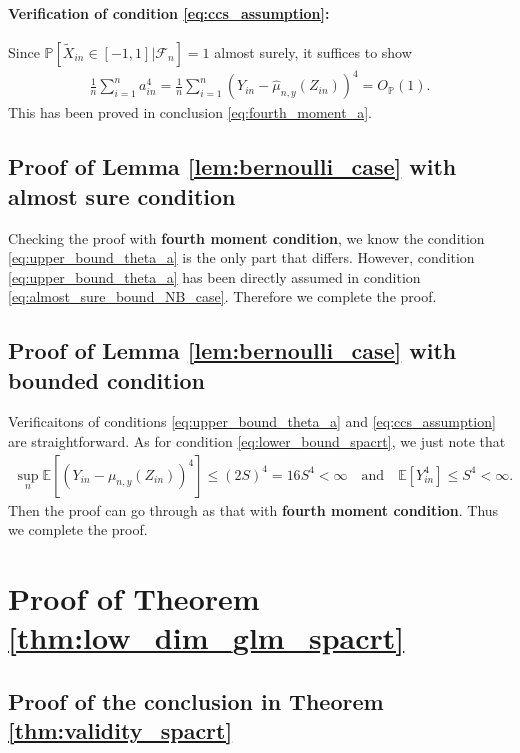 \documentclass[12pt]{article}
\theoremstyle{definition}
\def\P{\mathbb{P}}
\def\P{\mathbb{P}}
\newcommand{\E}{\mathbb E}								%
\renewcommand{\P}{\mathbb{P}}							%
\newcommand{\srz}{Z}									%
\newcommand{\srxk}{\widetilde X}						%
\newcommand{\sry}{Y}									%
\begin{document}
  \paragraph{Verification of condition \eqref{eq:ccs_assumption}:}

  Since $\P[\srxk_{in}\in [-1,1]|\mathcal{F}_n]=1$ almost surely, it suffices to show 
  \begin{align*}
    \frac{1}{n}\sum_{i=1}^n a_{in}^4=\frac{1}{n}\sum_{i=1}^n (\sry_{in}-\widehat{\mu}_{n,y}(\srz_{in}))^4=O_{\P}(1).
  \end{align*}
  This has been proved in conclusion \eqref{eq:fourth_moment_a}.

\subsection{Proof of Lemma \ref{lem:bernoulli_case} with almost sure condition}

Checking the proof with \textbf{fourth moment condition}, we know the condition \eqref{eq:upper_bound_theta_a} is the only part that differs. However, condition \eqref{eq:upper_bound_theta_a} has been directly assumed in condition \eqref{eq:almost_sure_bound_NB_case}. Therefore we complete the proof.

\subsection{Proof of Lemma \ref{lem:bernoulli_case} with bounded condition}

Verificaitons of conditions \eqref{eq:upper_bound_theta_a} and \eqref{eq:ccs_assumption} are straightforward. As for condition \eqref{eq:lower_bound_spacrt}, we just note that 
\begin{align*}
  \sup_n\E[(\sry_{in}-\mu_{n,y}(\srz_{in}))^4]\leq (2S)^4=16S^4<\infty\quad\text{and}\quad \E[\sry_{in}^4]\leq S^4<\infty.
\end{align*}
Then the proof can go through as that with \textbf{fourth moment condition}. Thus we complete the proof.



\section{Proof of Theorem \ref{thm:low_dim_glm_spacrt}}

\subsection{Proof of the conclusion in Theorem \ref{thm:validity_spacrt}}\label{sec:NB_approximation_accuracy}
\end{document}
